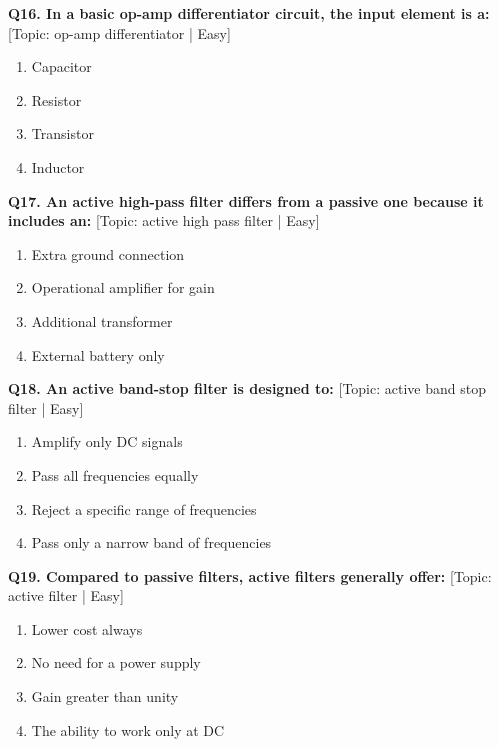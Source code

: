 \noindent\textbf{Q16. In a basic op-amp differentiator circuit, the input element is a:} \hfill [Topic: op-amp differentiator | Easy]
\begin{enumerate}[label=(\alph*),topsep=2pt,itemsep=1pt,partopsep=0pt,parsep=0pt]
    \item {Capacitor}
    \item {Resistor}
    \item {Transistor}
    \item {Inductor}
\end{enumerate}
\vspace{2mm}

\noindent\textbf{Q17. An active high-pass filter differs from a passive one because it includes an:} \hfill [Topic: active high pass filter | Easy]
\begin{enumerate}[label=(\alph*),topsep=2pt,itemsep=1pt,partopsep=0pt,parsep=0pt]
    \item {Extra ground connection}
    \item {Operational amplifier for gain}
    \item {Additional transformer}
    \item {External battery only}
\end{enumerate}
\vspace{2mm}

\noindent\textbf{Q18. An active band-stop filter is designed to:} \hfill [Topic: active band stop filter | Easy]
\begin{enumerate}[label=(\alph*),topsep=2pt,itemsep=1pt,partopsep=0pt,parsep=0pt]
    \item {Amplify only DC signals}
    \item {Pass all frequencies equally}
    \item {Reject a specific range of frequencies}
    \item {Pass only a narrow band of frequencies}
\end{enumerate}
\vspace{2mm}

\noindent\textbf{Q19. Compared to passive filters, active filters generally offer:} \hfill [Topic: active filter | Easy]
\begin{enumerate}[label=(\alph*),topsep=2pt,itemsep=1pt,partopsep=0pt,parsep=0pt]
    \item {Lower cost always}
    \item {No need for a power supply}
    \item {Gain greater than unity}
    \item {The ability to work only at DC}
\end{enumerate}
\vspace{2mm}

